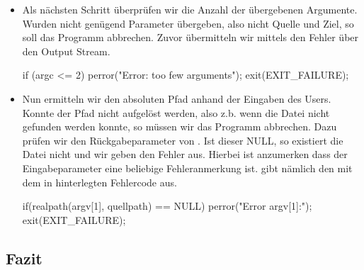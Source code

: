 \begin{itemize}
\item Als nächsten Schritt überprüfen wir die Anzahl der übergebenen Argumente.
Wurden nicht genügend Parameter übergeben, also nicht Quelle und Ziel, so soll
das Programm abbrechen. Zuvor übermitteln wir mittels  den Fehler
über den  Output Stream.

\begin{lslisting}
	if (argc <= 2){
		perror("Error: too few arguments");
		exit(EXIT_FAILURE);
	}
\end{lslisting}

\item Nun ermitteln wir den absoluten Pfad anhand der Eingaben des Users.
Konnte der Pfad nicht aufgelöst werden, also z.b. wenn die Datei nicht
gefunden werden konnte, so müssen wir das Programm abbrechen.
Dazu prüfen wir den Rückgabeparameter von .
Ist dieser NULL, so existiert die Datei nicht und wir geben den Fehler
aus.
Hierbei ist anzumerken dass der Eingabeparameter eine beliebige Fehleranmerkung
ist.  gibt nämlich den mit dem in  hinterlegten
Fehlercode aus.
\begin{lslisting}
	if(realpath(argv[1], quellpath) == NULL){
		perror("Error argv[1]:");
		exit(EXIT_FAILURE);
	}
\end{lslisting}

\end{itemize} %



	\subsection{Fazit}

\newpage
